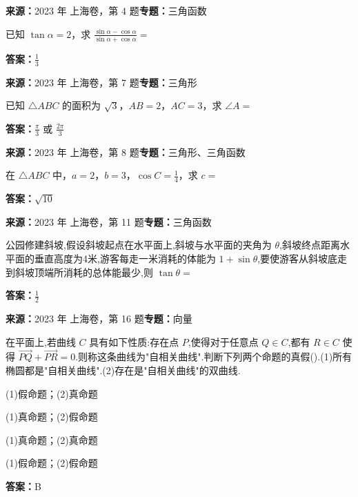 \begin{question}[points=4]
\textbf{来源：}2023 年 上海卷，第 4 题\quad \textbf{专题：}三角函数\par
已知 $\tan \alpha = 2$，求 $\frac{\sin \alpha - \cos \alpha}{\sin \alpha + \cos \alpha}=$
\fillin[{$\frac{1}{3}$}]
\begin{solution}
\textbf{答案：}$\frac{1}{3}$
\end{solution}
\end{question}

\begin{question}[points=5]
\textbf{来源：}2023 年 上海卷，第 7 题\quad \textbf{专题：}三角形\par
已知 $\triangle ABC$ 的面积为 $\sqrt{3}$，$AB=2$，$AC=3$，求 $\angle A=$
\begin{solution}
\textbf{答案：}$\frac{\pi}{3}$ 或 $\frac{2\pi}{3}$
\end{solution}
\end{question}

\begin{question}[points=5]
\textbf{来源：}2023 年 上海卷，第 8 题\quad \textbf{专题：}三角形、三角函数\par
在 $\triangle ABC$ 中，$a=2$，$b=3$，$\cos C = \frac{1}{4}$，求 $c=$
\fillin[{$\sqrt{10}$}]
\begin{solution}
\textbf{答案：}$\sqrt{10}$
\end{solution}
\end{question}

\begin{question}[points=5]
\textbf{来源：}2023 年 上海卷，第 11 题\quad \textbf{专题：}三角函数\par
公园修建斜坡,假设斜坡起点在水平面上,斜坡与水平面的夹角为 $\theta$,斜坡终点距离水平面的垂直高度为4米,游客每走一米消耗的体能为 $1+\sin \theta$,要使游客从斜坡底走到斜坡顶端所消耗的总体能最少,则 $\tan \theta=$
\fillin[{$\frac{1}{2}$}]
\begin{solution}
\textbf{答案：}$\frac{1}{2}$
\end{solution}
\end{question}

\begin{question}[points=5]
\textbf{来源：}2023 年 上海卷，第 16 题\quad \textbf{专题：}向量\par
在平面上,若曲线 $C$ 具有如下性质:存在点 $P$,使得对于任意点 $Q\in C$,都有 $R\in C$ 使得 $\overrightarrow{PQ}+\overrightarrow{PR}=0$.则称这条曲线为"自相关曲线".判断下列两个命题的真假().(1)所有椭圆都是"自相关曲线".(2)存在是"自相关曲线"的双曲线.
\begin{choices}
  \item (1)假命题；(2)真命题
  \item (1)真命题；(2)假命题
  \item (1)真命题；(2)真命题
  \item (1)假命题；(2)假命题
\end{choices}
\begin{solution}
\textbf{答案：}B
\end{solution}
\end{question}

